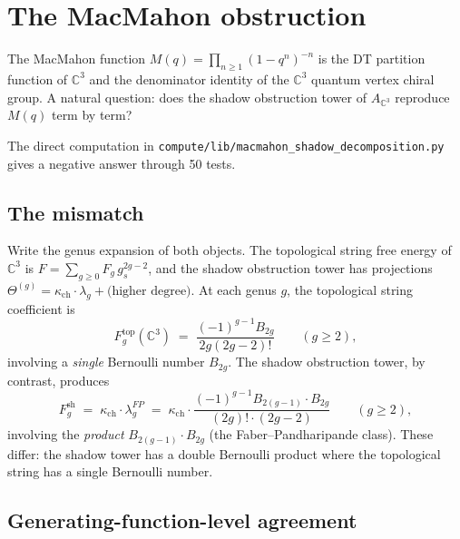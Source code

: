 \documentclass[11pt]{amsart}
\theoremstyle{plain}
\theoremstyle{definition}
\theoremstyle{remark}
\begin{document}
\section{The MacMahon obstruction}
\label{sec:macmahon-obstruction}

The MacMahon function $M(q) = \prod_{n \geq 1} (1-q^n)^{-n}$
is the DT partition function of $\mathbb{C}^3$ and the denominator
identity of the $\mathbb{C}^3$ quantum vertex chiral group.
A natural question: does the shadow obstruction tower of
$A_{\mathbb{C}^3}$ reproduce $M(q)$ term by term?

The direct computation in
\texttt{compute/lib/macmahon\_shadow\_decomposition.py} gives a negative
answer through 50 tests.

\subsection{The mismatch}

Write the genus expansion of both objects. The topological string
free energy of $\mathbb{C}^3$ is $F = \sum_{g \geq 0} F_g \, g_s^{2g-2}$,
and the shadow obstruction tower has projections
$\Theta^{(g)} = \kappa_{\mathrm{ch}} \cdot \lambda_g + \text{(higher degree)}$.
At each genus $g$, the topological string coefficient is
\[
 F_g^{\mathrm{top}}(\mathbb{C}^3) \;=\;
 \frac{(-1)^{g-1} B_{2g}}{2g(2g-2)!}
 \qquad (g \geq 2),
\]
involving a \emph{single} Bernoulli number $B_{2g}$. The
shadow obstruction tower, by contrast, produces
\[
 F_g^{\mathrm{sh}} \;=\; \kappa_{\mathrm{ch}} \cdot \lambda_g^{FP}
 \;=\; \kappa_{\mathrm{ch}} \cdot
 \frac{(-1)^{g-1} B_{2(g-1)} \cdot B_{2g}}{(2g)! \cdot (2g-2)}
 \qquad (g \geq 2),
\]
involving the \emph{product} $B_{2(g-1)} \cdot B_{2g}$
(the Faber--Pandharipande class). These differ: the shadow
tower has a double Bernoulli product where the topological
string has a single Bernoulli number.

\subsection{Generating-function-level agreement}
\end{document}
